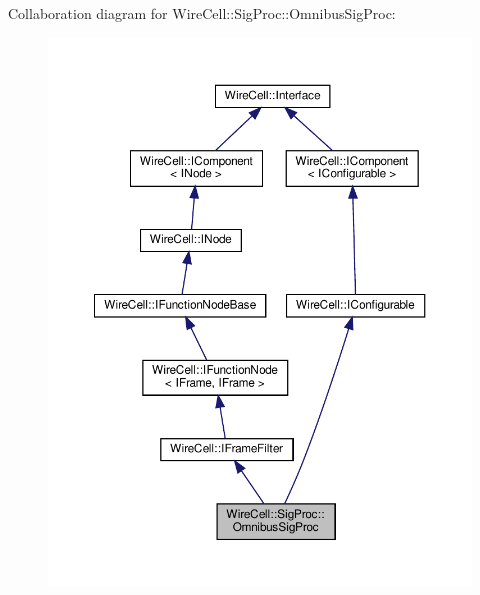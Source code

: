 Collaboration diagram for Wire\+Cell\+:\+:Sig\+Proc\+:\+:Omnibus\+Sig\+Proc\+:
\nopagebreak
\begin{figure}[H]
\begin{center}
\leavevmode
\includegraphics[width=350pt]{class_wire_cell_1_1_sig_proc_1_1_omnibus_sig_proc__coll__graph}
\end{center}
\end{figure}
